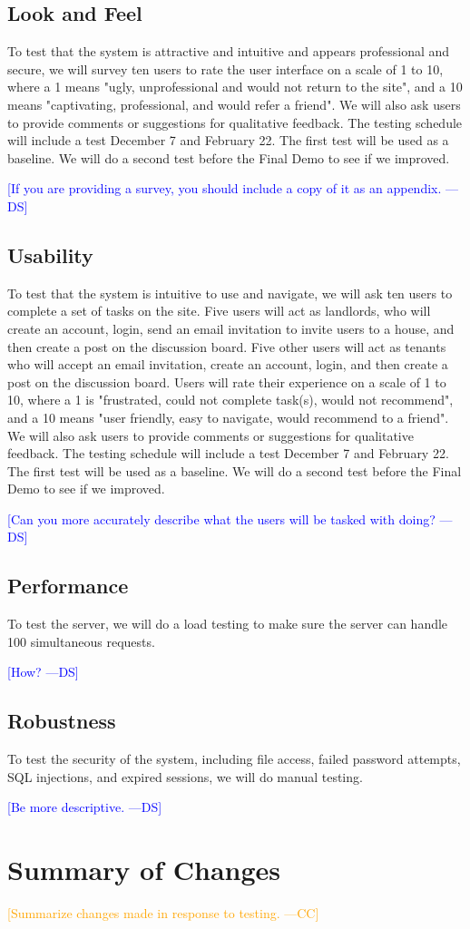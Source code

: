\documentclass[12pt]{article}
\newcommand{\authornote}[3]{\textcolor{#1}{[#3 ---#2]}}
\newcommand{\authornote}[3]{}
\newcommand{\ds}[1]{\authornote{blue}{DS}{#1}}
\newcommand{\cc}[1]{\authornote{orange}{CC}{#1}}
\begin{document}
\subsection{Look and Feel}
To test that the system is attractive and intuitive and appears professional and secure, we will survey ten users to rate the user interface on a scale of 1 to 10, where a 1 means "ugly, unprofessional and would not return to the site", and a 10 means "captivating, professional, and would refer a friend". We will also ask users to provide comments or suggestions for qualitative feedback. The testing schedule will include a test December 7 and February 22. The first test will be used as a baseline. We will do a second test before the Final Demo to see if we improved.

\ds{If you are providing a survey, you should include a copy of it as an appendix.}

\subsection{Usability}
To test that the system is intuitive to use and navigate, we will ask ten users to complete a set of tasks on the site. Five users will act as landlords, who will create an account, login, send an email invitation to invite users to a house, and then create a post on the discussion board. Five other users will act as tenants who will accept an email invitation, create an account, login, and then create a post on the discussion board. Users will rate their experience on a scale of 1 to 10, where a 1 is "frustrated, could not complete task(s), would not recommend", and a 10 means "user friendly, easy to navigate, would recommend to a friend".  We will also ask users to provide comments or suggestions for qualitative feedback. The testing schedule will include a test December 7 and February 22. The first test will be used as a baseline. We will do a second test before the Final Demo to see if we improved.

\ds{Can you more accurately describe what the users will be tasked with doing?}

\subsection{Performance}
To test the server, we will do a load testing to make sure the server can handle 100 simultaneous requests.

\ds{How?}

\subsection{Robustness}
To test the security of the system, including file access, failed password attempts, SQL injections, and expired sessions, we will do manual testing.

\ds{Be more descriptive.}

\section{Summary of Changes}
\cc{Summarize changes made in response to testing.}
\end{document}
